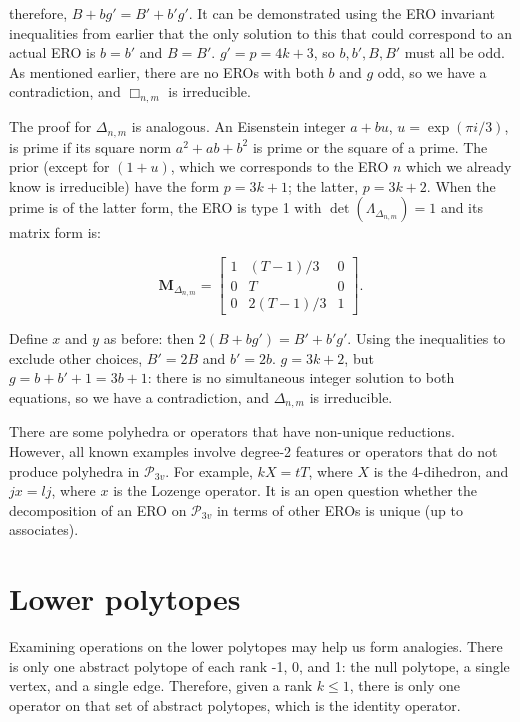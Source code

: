 \documentclass{amsart}[12pt]
\begin{document}
therefore, $B+bg' = B'+b'g'$. It can be demonstrated using the ERO
invariant inequalities from earlier that the only solution to this that could
correspond to an actual ERO is $b=b'$ and $B=B'$.
$g' = p = 4k + 3$, so $b, b', B, B'$ must all be odd. As mentioned
earlier, there are no EROs with both $b$ and $g$ odd, so we have a
contradiction, and $\Box_{n,m}$ is irreducible.

The proof for $\Delta_{n,m}$ is analogous. An Eisenstein integer
$a + bu$, $u=\exp(\pi i/3)$, is prime if its square norm
$a^2 + ab + b^2$ is prime or the square of a prime. The prior (except
for $(1 + u)$, which we corresponds to the ERO $n$ which we already
know is irreducible) have the form $p=3k+1$; the latter, $p=3k+2$.
When the prime is of the latter form, the ERO is type 1 with
$\det(\Lambda_{\Delta_{n,m}}) = 1$ and its matrix form is:

\begin{equation}
   \mathbf{M}_{\Delta_{n,m}} = \begin{bmatrix}
          1 & (T-1)/3 & 0 \\
          0 & T & 0 \\
          0 & 2(T-1)/3 & 1 \end{bmatrix}.
\end{equation}

Define $x$ and $y$ as before: then $2(B+bg') = B'+b'g'$. Using the
inequalities to exclude other choices, $B' = 2B$ and $b' = 2b$.
$g = 3k + 2$, but $g = b+ b' + 1 = 3b+1$:
there is no simultaneous integer solution to both equations,
so we have a contradiction, and $\Delta_{n,m}$ is irreducible.

There are some polyhedra or operators that have non-unique reductions. However,
all known examples involve degree-2 features or operators that do not produce
polyhedra in $\mathcal{P}_{3v}$. For example, $kX = tT$, where $X$ is the
4-dihedron, and $jx = lj$, where $x$ is the Lozenge operator. It is an open
question whether the decomposition of an ERO on $\mathcal{P}_{3v}$ in terms of
other EROs is unique (up to associates).

\section{Lower polytopes}

Examining operations on the lower polytopes may help us form analogies.
There is only one abstract polytope of each rank -1, 0, and 1:
the null polytope, a single vertex, and a single edge. Therefore,
given a rank $k \le 1$, there is only one operator on that set of abstract
polytopes, which is the identity operator.
\end{document}
